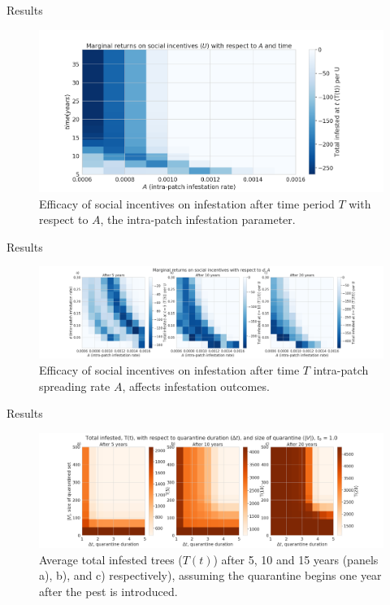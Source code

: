 \documentclass{beamer}
\begin{document}
\begin{frame}{Results}
    \begin{figure}
        \includegraphics[width=\textwidth]{firewood/A_v_time.png}
        \caption{Efficacy of social incentives on infestation after time period $T$ with respect to $A$, the intra-patch infestation parameter.}
    \end{figure}
\end{frame}

\begin{frame}{Results}
    \begin{figure}
        \includegraphics[width=\textwidth]{firewood/A_v_ct_v_d_marginal_gain.png}
        \caption{Efficacy of social incentives on infestation after time $T$ intra-patch spreading rate $A$, affects infestation outcomes.}
    \end{figure}
\end{frame}
\begin{frame}{Results}
    \begin{figure}
        \includegraphics[width=\textwidth]{firewood/node_quarantine_plot_1.0.png}
        \caption{Average total infested trees ($T(t)$) after 5, 10 and 15 years (panels a), b), and c) respectively), assuming the quarantine begins one year after the pest is introduced.}
    \end{figure}
\end{frame}
\end{document}
